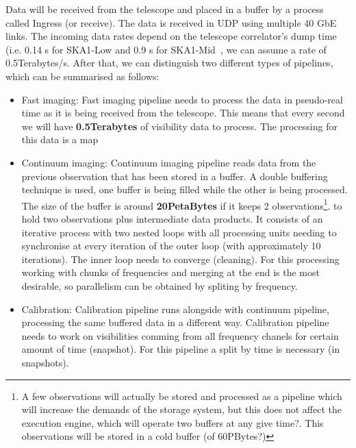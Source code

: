 Data will be received from the telescope and placed in a buffer by a process called Ingress (or receive). The data is received in UDP using multiple 
40 GbE links. The incoming data rates depend on the telescope correlator's dump time (i.e. 0.14 s for SKA1-Low and 0.9 s for SKA1-Mid~\cite{ParametricModel}, 
we can assume a rate of 0.5Terabytes/s. After that, we can distinguish two different types of pipelines, which can be 
summarised as follows:
\begin{itemize}
\item Fast imaging: Fast imaging pipeline needs to process the data in pseudo-real time as it is being received from the telescope.
 This means that every second we will have \textbf{0.5Terabytes} of visibility data to process. The processing for this data is a map
\item Continuum imaging: Continuum imaging pipeline reads data from the previous observation that has been stored in a buffer.
A double buffering technique is used, one buffer is being filled while the other is being processed. The size of the buffer is around \textbf{20PetaBytes}
if it keeps 2 observations\footnote{A few observations will actually be stored and processed as a pipeline which will increase the demands of the storage system,
but this does not affect the execution engine, which will operate two buffers at any give time?.
This observations will be stored in a cold buffer (of 60PBytes?)}.
to hold two observations plus intermediate data products. It consists of an iterative process with two nested loops with all processing units needing
to synchronise at every iteration of the outer loop (with approximately 10 iterations). The inner loop needs to converge (cleaning).
For this processing working with chunks of frequencies and merging at the end is the most desirable, so parallelism can be obtained by spliting 
by frequency. 
\item Calibration: Calibration pipeline runs alongside with continuum pipeline, processing the same buffered data in a different way.
Calibration pipeline needs to work on visibilities comming from all frequency chanels for certain amount of time (snapshot). For this pipeline 
a split by time is necessary (in snapshots). 
\end{itemize}



